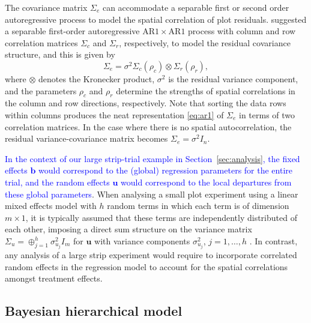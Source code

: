 \documentclass[a4paper]{article}   	%
\newcommand{\AR}{\mathrm{AR}1}
\begin{document}
	The covariance matrix $\Sigma_e$ can accommodate a separable first or second order autoregressive process to model the spatial correlation of plot residuals. \textcite{Gilmour1997Accounting} suggested a separable first-order autoregressive $\AR\times \AR$ process with column and row correlation matrices $\Sigma_c$ and $\Sigma_r$, respectively, to model the residual covariance structure, and this is given by 
	\begin{equation}\label{eq:ar1}
		\Sigma_e =\sigma^2\Sigma_c(\rho_c) \otimes \Sigma_r(\rho_r),
	\end{equation}
	where $\otimes$ denotes the Kronecker product, $\sigma^2$ is the residual variance component, and the parameters $\rho_c$ and $\rho_r$ determine the strengths of spatial correlations in the column and row directions, respectively. Note that sorting the data rows within columns produces the neat representation \eqref{eq:ar1} of $\Sigma_e$ in terms of two correlation matrices. In the case where there is no spatial autocorrelation, the residual variance-covariance matrix becomes $\Sigma_e=\sigma^2 I_n$. 
	
	\textcolor{blue}{In the context of our large strip-trial example in Section~\ref{sec:analysis}, the fixed effects $\bm{b}$ would correspond to the (global) regression parameters for the entire trial, and the random effects $\bm{u}$ would correspond to the local departures from these global parameters}. When analysing a small plot experiment using a linear mixed effects model with $h$ random terms in which each term is of dimension $m\times 1$, it is typically assumed that these terms are independently distributed of each other, imposing a direct sum structure on the variance matrix $\Sigma_u=\oplus_{j=1}^h\sigma_{u_j}^2I_m$ for $\bm{u}$ with variance components $\sigma^{2}_{u_j}$, $j=1,\ldots,h$ \parencite{butler2009}. In contrast, any analysis of a large strip experiment would require to incorporate correlated random effects in the regression model to account for the spatial correlations amongst treatment effects. 
	
	
	
	\subsection{Bayesian hierarchical model}\label{sec:hierarchical}
	
\end{document}
